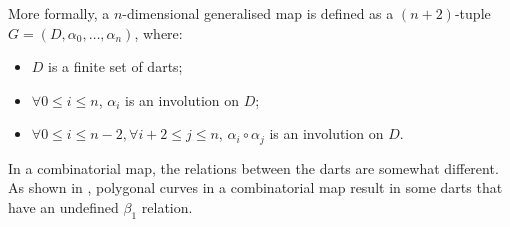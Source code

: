More formally, a $n$-dimensional generalised map is defined as a $(n+2)$-tuple $G = (D,\alpha_{0},\ldots,\alpha_{n})$, where:

\begin{itemize}
\item
$D$ is a finite set of darts;

\item
$\forall 0 \leq i \leq n$, $\alpha_{i}$ is an involution on $D$;

\item
$\forall 0 \leq i \leq n-2, \forall i+2 \leq j \leq n$, $\alpha_{i}\circ \alpha_{j}$ is an involution on $D$.
\end{itemize}

In a combinatorial map, the relations between the darts are somewhat different.
As shown in , polygonal curves in a combinatorial map result in some darts that have an undefined $\beta_1$ relation.
